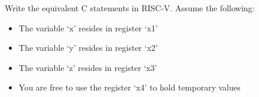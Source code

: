 \begin{blocksection}
\question
Write the equivalent C statements in RISC-V. Assume the following:

\begin{itemize}
\item The variable ‘x’ resides in register ‘x1’
\item The variable ‘y’ resides in register ‘x2’
\item The variable ‘z’ resides in register ‘x3’
\item You are free to use the register ‘x4’ to hold temporary values
\end{itemize}

\end{blocksection}
